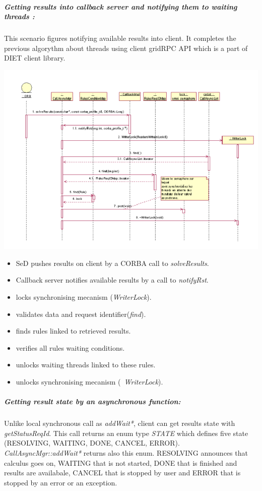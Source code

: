   \subparagraph{Getting results into callback server and notifying them to waiting threads :}
  This scenario figures notifying available results into client. It completes
  the previous algorythm about threads using client gridRPC API which is a
  part of DIET client library.

  \begin{center}
  \includegraphics{./fig/CallbackSynchronisationSequenceDiagram}
  \end{center}

  \begin{itemize}
  \item SeD pushes results on client by a CORBA call to \emph{solveResults}.
  \item Callback server notifies available results by a call to \emph{notifyRst}.
  \item locks synchronising mecanism (\emph{WriterLock}).
  \item validates data and request identifier(\emph{find}).
  \item finds rules linked to retrieved results.
  \item verifies all rules waiting conditions.
  \item unlocks waiting threads linked to these rules.
  \item unlocks synchronising mecanism (\emph{~WriterLock}).
  \end{itemize}

  \subparagraph{Getting result state by an asynchronous function:}
  Unlike local synchronous call as \emph{addWait*}, client can get results
  state with \emph{getStatusReqId}. This call returns an enum type \emph{STATE}
  which defines five state (RESOLVING, WAITING, DONE, CANCEL, ERROR).
  \emph{CallAsyncMgr::addWait*} returns also this enum.
  RESOLVING announces that calculus goes on, WAITING that is not started,
  DONE that is finished and results are availabale, CANCEL that is stopped
  by user and ERROR that is stopped by an error or an exception.

